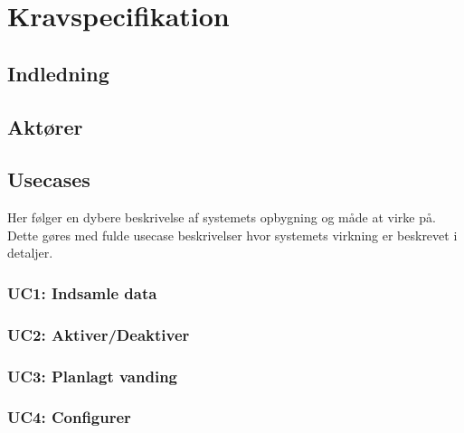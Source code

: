 \chapter{Kravspecifikation}

\clearpage


\section{Indledning}



\section{Aktører}



\section{Usecases}

Her følger en dybere beskrivelse af systemets opbygning og måde at virke på. Dette gøres med fulde usecase beskrivelser hvor systemets virkning er beskrevet i detaljer.


\subsection{UC1: Indsamle data}



\subsection{UC2: Aktiver/Deaktiver}



\subsection{UC3: Planlagt vanding}



\subsection{UC4: Configurer}


